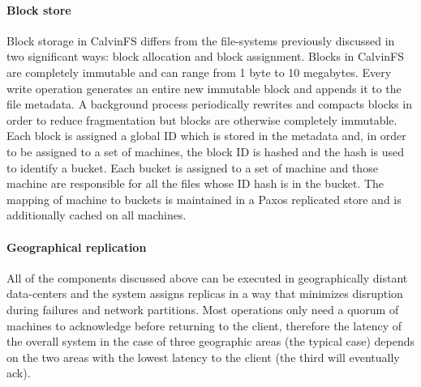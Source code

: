 \paragraph{Block store} Block storage in CalvinFS differs from the file-systems previously discussed in two significant ways: block allocation and block assignment.
Blocks in CalvinFS are completely immutable and can range from 1 byte to 10 megabytes.
Every write operation generates an entire new immutable block and appends it to the file metadata.
A background process periodically rewrites and compacts blocks in order to reduce fragmentation but blocks are otherwise completely immutable.
Each block is assigned a global ID which is stored in the metadata and, in order to be assigned to a set of machines, the block ID is hashed and the hash is used to identify a bucket.
Each bucket is assigned to a set of machine and those machine are responsible for all the files whose ID hash is in the bucket.
The mapping of machine to buckets is maintained in a Paxos replicated store and is additionally cached on all machines.

\paragraph{Geographical replication} All of the components discussed above can be executed in geographically distant data-centers and the system assigns replicas in a way that minimizes disruption during failures and network partitions.
Most operations only need a quorum of machines to acknowledge before returning to the client, therefore the latency of the overall system in the case of three geographic areas (the typical case) depends on the two areas with the lowest latency to the client (the third will eventually ack).